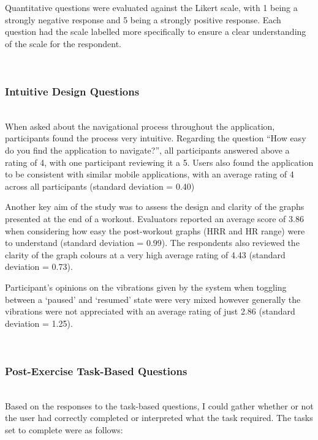 \documentclass{l4proj}
\begin{document}
Quantitative questions were evaluated against the Likert scale, with 1 being a strongly negative response and 5 being a strongly positive response. Each question had the scale labelled more specifically to ensure a clear understanding of the scale for the respondent.

\noindent\mbox{}\\
\subsubsection{Intuitive Design Questions}
\noindent\mbox{}\\

When asked about the navigational process throughout the application, participants found the process very intuitive. Regarding the question “How easy do you find the application to navigate?”, all participants answered above a rating of 4, with one participant reviewing it a 5. Users also found the application to be consistent with similar mobile applications, with an average rating of 4 across all participants (standard deviation = 0.40)

Another key aim of the study was to assess the design and clarity of the graphs presented at the end of a workout. Evaluators reported an average score of 3.86 when considering how easy the post-workout graphs (HRR and HR range) were to understand (standard deviation = 0.99). The respondents also reviewed the clarity of the graph colours at a very high average rating of 4.43 (standard deviation = 0.73).

Participant’s opinions on the vibrations given by the system when toggling between a ‘paused’ and ‘resumed’ state were very mixed however generally the vibrations were not appreciated with an average rating of just 2.86 (standard deviation = 1.25).

\noindent\mbox{}\\
\subsubsection{Post-Exercise Task-Based Questions}
\noindent\mbox{}\\

Based on the responses to the task-based questions, I could gather whether or not the user had correctly completed or interpreted what the task required. The tasks set to complete were as follows:
\end{document}
